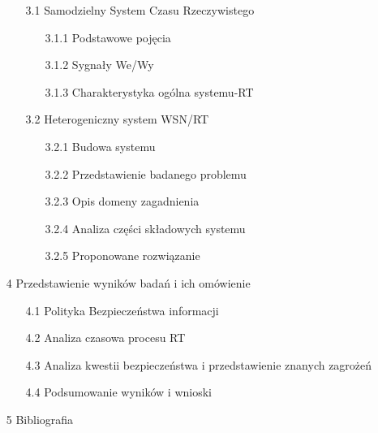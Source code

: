 \begin{itemize}
            \begin{itemize}
            	\item [3.1] Samodzielny System Czasu Rzeczywistego
            	\begin{itemize}
            			\item [3.1.1] Podstawowe pojęcia 
            			\item [3.1.2] Sygnały We/Wy
            			\item [3.1.3] Charakterystyka ogólna systemu-RT
            	\end{itemize}
            	\item [3.2] Heterogeniczny system WSN/RT
            	\begin{itemize}
            			\item [3.2.1] Budowa systemu
            			\item [3.2.2] Przedstawienie badanego problemu
        				\item [3.2.3] Opis domeny zagadnienia
        				\item [3.2.4] Analiza części składowych systemu
        				\item [3.2.5] Proponowane rozwiązanie
            	\end{itemize}	
            \end{itemize}
            \item [4] Przedstawienie wyników badań i ich omówienie
            \begin{itemize}
            	\item [4.1] Polityka Bezpieczeństwa informacji
            	\item [4.2] Analiza czasowa procesu RT 
            	\item [4.3] Analiza kwestii bezpieczeństwa i przedstawienie znanych zagrożeń
            	\item [4.4] Podsumowanie wyników i wnioski
            \end{itemize}
            \item [5] Bibliografia
        \end{itemize}


\clearpage 